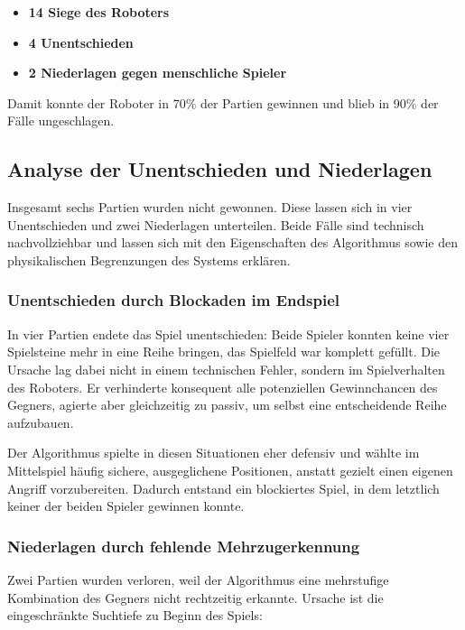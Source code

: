 \begin{itemize}
	\item \textbf{14 Siege des Roboters}
	\item \textbf{4 Unentschieden}
	\item \textbf{2 Niederlagen gegen menschliche Spieler}
\end{itemize}

Damit konnte der Roboter in 70\% der Partien gewinnen und blieb in 90\% der Fälle ungeschlagen.

\subsection{Analyse der Unentschieden und Niederlagen}

Insgesamt sechs Partien wurden nicht gewonnen. Diese lassen sich in vier Unentschieden und zwei Niederlagen unterteilen. Beide Fälle sind technisch nachvollziehbar und lassen sich mit den Eigenschaften des Algorithmus sowie den physikalischen Begrenzungen des Systems erklären.

\subsubsection{Unentschieden durch Blockaden im Endspiel}

In vier Partien endete das Spiel unentschieden: Beide Spieler konnten keine vier Spielsteine mehr in eine Reihe bringen, das Spielfeld war komplett gefüllt. Die Ursache lag dabei nicht in einem technischen Fehler, sondern im Spielverhalten des Roboters. Er verhinderte konsequent alle potenziellen Gewinnchancen des Gegners, agierte aber gleichzeitig zu passiv, um selbst eine entscheidende Reihe aufzubauen.

Der Algorithmus spielte in diesen Situationen eher defensiv und wählte im Mittelspiel häufig sichere, ausgeglichene Positionen, anstatt gezielt einen eigenen Angriff vorzubereiten. Dadurch entstand ein blockiertes Spiel, in dem letztlich keiner der beiden Spieler gewinnen konnte.

\subsubsection{Niederlagen durch fehlende Mehrzugerkennung}

Zwei Partien wurden verloren, weil der Algorithmus eine mehrstufige Kombination des Gegners nicht rechtzeitig erkannte. Ursache ist die eingeschränkte Suchtiefe zu Beginn des Spiels:

